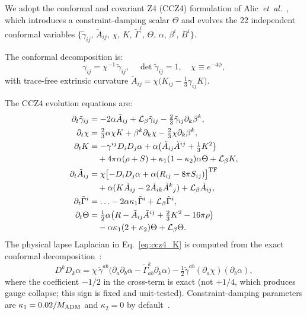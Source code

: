 \documentclass[aps,prd,twocolumn,superscriptaddress,nofootinbib,showpacs,
               longbibliography]{revtex4-2}
\newcommand{\Lie}{\mathcal{L}}
\begin{document}
We adopt the conformal and covariant Z4 (CCZ4) formulation of
Alic~\emph{et~al.}~\cite{Alic2012}, which introduces a
constraint-damping scalar $\Theta$ and evolves the 22 independent conformal
variables
$\bigl\{\tilde\gamma_{ij},\,\tilde A_{ij},\,\chi,\,K,\,\tilde\Gamma^i,
\,\Theta,\,\alpha,\,\beta^i,\,B^i\bigr\}$.

The conformal decomposition is:
\begin{equation}
  \gamma_{ij} = \chi^{-1}\,\tilde\gamma_{ij},\quad
  \det\tilde\gamma_{ij} = 1,\quad
  \chi \equiv e^{-4\phi},
  \label{eq:conformal}
\end{equation}
with trace-free extrinsic curvature
$\tilde A_{ij} = \chi\bigl(K_{ij} - \tfrac{1}{3}\gamma_{ij}K\bigr)$.

The CCZ4 evolution equations are:
\begin{align}
  \partial_t\tilde\gamma_{ij} &= -2\alpha\tilde A_{ij}
    + \Lie_\beta\tilde\gamma_{ij}
    - \tfrac{2}{3}\tilde\gamma_{ij}\partial_k\beta^k,
  \label{eq:ccz4_gamma} \\
  \partial_t\chi &= \tfrac{2}{3}\alpha\chi K
    + \beta^k\partial_k\chi
    - \tfrac{2}{3}\chi\partial_k\beta^k,
  \label{eq:ccz4_chi} \\
  \partial_t K &= -\gamma^{ij}D_iD_j\alpha
    + \alpha\bigl(\tilde A_{ij}\tilde A^{ij} + \tfrac{1}{3}K^2\bigr)
  \nonumber\\
  &\quad + 4\pi\alpha(\rho + S)
    + \kappa_1(1-\kappa_2)\alpha\Theta + \Lie_\beta K,
  \label{eq:ccz4_K} \\
  \partial_t\tilde A_{ij} &= \chi\bigl[-D_iD_j\alpha
    + \alpha(R_{ij} - 8\pi S_{ij})\bigr]^{\rm TF}
  \nonumber \\
  &\quad + \alpha(K\tilde A_{ij} - 2\tilde A_{ik}\tilde A^k{}_j)
    + \Lie_\beta\tilde A_{ij},
  \label{eq:ccz4_A} \\
  \partial_t\tilde\Gamma^i &= \ldots
    - 2\alpha\kappa_1\tilde\Gamma^i + \Lie_\beta\tilde\Gamma^i,
  \label{eq:ccz4_Gamma}\\
  \partial_t\Theta &= \tfrac{1}{2}\alpha\bigl(R - \tilde A_{ij}\tilde A^{ij}
    + \tfrac{2}{3}K^2 - 16\pi\rho\bigr)
  \nonumber \\
  &\quad - \alpha\kappa_1(2+\kappa_2)\Theta + \Lie_\beta\Theta.
  \label{eq:ccz4_Theta}
\end{align}
The physical lapse Laplacian in Eq.~\eqref{eq:ccz4_K} is computed from the
exact conformal decomposition~\cite{BaumgarteShapiro2010}:
\begin{equation}
  D^kD_k\alpha = \chi\,\tilde\gamma^{ab}\bigl(\partial_a\partial_b\alpha
    - \tilde\Gamma^k_{ab}\partial_k\alpha\bigr)
    - \tfrac{1}{2}\tilde\gamma^{ab}(\partial_a\chi)(\partial_b\alpha),
  \label{eq:lap_alpha}
\end{equation}
where the coefficient $-1/2$ in the cross-term is exact (not $+1/4$, which
produces gauge collapse; this sign is fixed and unit-tested).
Constraint-damping parameters are $\kappa_1 = 0.02/M_{\rm ADM}$ and
$\kappa_2 = 0$ by default~\cite{Alic2012}.
\end{document}
